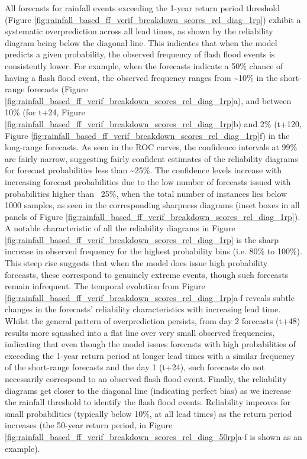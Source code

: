 All  forecasts for rainfall events exceeding the 1-year return period threshold (Figure \ref{fig:rainfall_based_ff_verif_breakdown_scores_rel_diag_1rp}) exhibit a systematic overprediction across all lead times, as shown by the reliability diagram being below the diagonal line. This indicates that when the model predicts a given probability, the observed frequency of flash flood events is consistently lower. For example, when the forecasts indicate a 50\% chance of having a flash flood event, the observed frequency ranges from \sim10\% in the short-range forecasts (Figure \ref{fig:rainfall_based_ff_verif_breakdown_scores_rel_diag_1rp}a), and between 10\% (for t+24, Figure \ref{fig:rainfall_based_ff_verif_breakdown_scores_rel_diag_1rp}b) and 2\% (t+120, Figure \ref{fig:rainfall_based_ff_verif_breakdown_scores_rel_diag_1rp}f) in the long-range forecasts. As seen in the ROC curves, the confidence intervals at 99\% are fairly narrow, suggesting fairly confident estimates of the reliability diagrams for forecast probabilities less than \sim25\%. The confidence levels increase with increasing forecast probabilities due to the low number of forecasts issued with probabilities higher than ~25\%, when the total number of instances lies below 1000 samples, as seen in the corresponding sharpness diagrams (inset boxes in all panels of Figure \ref{fig:rainfall_based_ff_verif_breakdown_scores_rel_diag_1rp}). A notable characteristic of all the reliability diagrams in Figure \ref{fig:rainfall_based_ff_verif_breakdown_scores_rel_diag_1rp} is the sharp increase in observed frequency for the highest probability bins (i.e. 80\% to 100\%). This steep rise suggests that when the model does issue high probability forecasts, these correspond to genuinely extreme events, though such forecasts remain infrequent. The temporal evolution from Figure \ref{fig:rainfall_based_ff_verif_breakdown_scores_rel_diag_1rp}a-f reveals subtle changes in the forecasts' reliability characteristics with increasing lead time. Whilst the general pattern of overprediction persists, from day 2 forecasts (t+48) results more squashed into a flat line over very small observed frequencies, indicating that even though the model issues forecasts with high probabilities of exceeding the 1-year return period at longer lead times with a similar frequency of the short-range forecasts and the day 1 (t+24), such forecasts do not necessarily correspond to an observed flash flood event. Finally, the reliability diagrams get closer to the diagonal line (indicating perfect bias) as we increase the rainfall threshold to identify the flash flood events. Reliability improves for small probabilities (typically below 10\%, at all lead times) as the return period increases (the 50-year return period, in Figure \ref{fig:rainfall_based_ff_verif_breakdown_scores_rel_diag_50rp}a-f is shown as an example).


